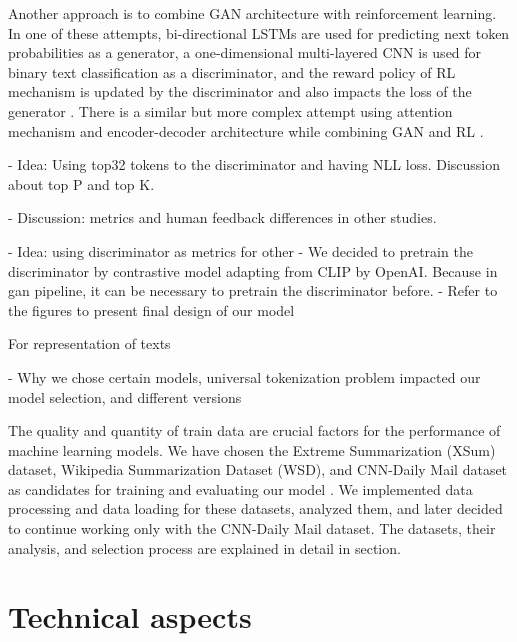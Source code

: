 \documentclass[11pt]{article}
\begin{document}
Another approach is to combine GAN architecture with reinforcement learning. In one of these attempts, bi-directional LSTMs are used for predicting next token probabilities as a generator, a one-dimensional multi-layered CNN is used for binary text classification as a discriminator, and the reward policy of RL mechanism is updated by the discriminator and also impacts the loss of the generator \cite{ganforas}. There is a similar but more complex attempt using attention mechanism and encoder-decoder architecture while combining GAN and RL \cite{sgan4as}.


- Idea: Using top32 tokens to the discriminator and having NLL loss. Discussion about top P and top K. \newline \newline

- Discussion: metrics and human feedback differences in other studies. \newline \newline

- Idea: using discriminator as metrics for other
- We decided to pretrain the discriminator by contrastive model adapting from CLIP by OpenAI. Because in gan pipeline, it can be necessary to pretrain the discriminator before. \newline \newline
- Refer to the figures to present final design of our model \newline \newline

For representation of texts 

- Why we chose certain models, universal tokenization problem impacted our model selection, and different versions

The quality and quantity of train data are crucial factors for the performance of machine learning models. We have chosen the Extreme Summarization (XSum) dataset, Wikipedia Summarization Dataset (WSD), and CNN-Daily Mail dataset as candidates for training and evaluating our model \cite{xsum, wsd, nallapati2016abstractive}. We implemented data processing and data loading for these datasets, analyzed them, and later decided to continue working only with the CNN-Daily Mail dataset. The datasets, their analysis, and selection process are explained in detail in  section. 


\section{Technical aspects}
\end{document}
